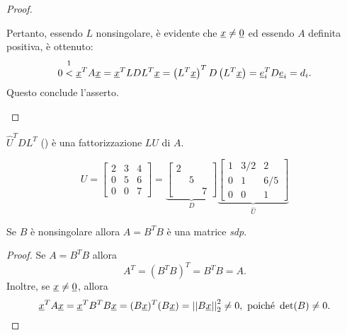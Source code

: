 \begin{proof}
\begin{itemize}
        Pertanto, essendo $L$ \gls{nonsingolare}, è evidente che $\uline x \neq \uline 0$ ed essendo $A$ definita positiva, è ottenuto:
        \begin{equation*}
            0\overset{\footnotemark}{<}\uline x^T A\uline x = \uline x^T LDL^T \uline x = \left(L^T \uline x\right)^T D \left(L^T \uline x\right) = \uline e_i^T D \uline e_i = d_i.
        \end{equation*}
        Questo conclude l'asserto.
    \end{itemize}
\end{proof}


\begin{remark}
    $\widehat U^TD L^T$ (\footnotemark) è una fattorizzazione $LU$ di $A$.
\end{remark}

\begin{example}
    \begin{equation*}
        U =
        \begin{bmatrix}
            2 & 3 & 4\\
            0 & 5 & 6\\
            0 & 0 & 7
        \end{bmatrix} = 
        \underbrace{
        \begin{bmatrix}
            2 & & \\
            & 5 &\\
            & & 7
        \end{bmatrix}}_{D}
        \underbrace{
        \begin{bmatrix}
            1 & 3/2 & 2\\
            0 & 1 & 6/5\\
            0 & 0 & 1
        \end{bmatrix}}_{\widehat U}
    \end{equation*}
\end{example}

\begin{theorem}
Se $B$ è \gls{nonsingolare} allora $A=B^TB$ è una matrice \textit{sdp}.
\end{theorem}
\begin{proof}
Se $A=B^TB$ allora
\begin{equation*}
	A^T=(B^TB)^T=B^TB=A.
\end{equation*}
Inoltre, se $\uline x\neq\uline 0$, allora
\begin{equation*}
	\uline x^T A \uline x = \uline x^T B^T B \uline x = (B\uline x)^T(B\uline x) = \left|\left| B\uline x \right|\right|_2^2\neq 0, \text{ poiché } \det(B)\neq 0.
\end{equation*}
\end{proof}

